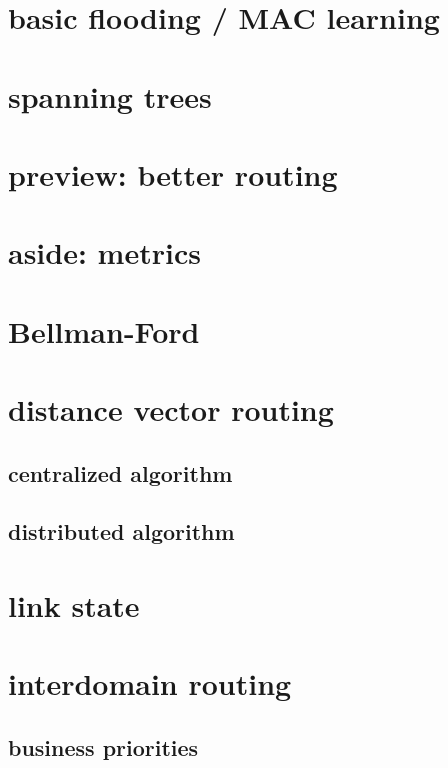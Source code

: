 \section{basic flooding / MAC learning}


\section{spanning trees}


\section{preview: better routing}


\section{aside: metrics}
\section{Bellman-Ford}

\section{distance vector routing}

\subsection{centralized algorithm}

\subsection{distributed algorithm}

\section{link state}

\section{interdomain routing}

\subsection{business priorities}

